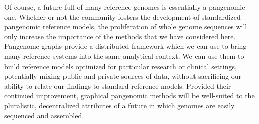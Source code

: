 Of course, a future full of many reference genomes is essentially a pangenomic one.
Whether or not the community fosters the development of standardized pangenomic reference models, the proliferation of whole genome sequences will only increase the importance of the methods that we have considered here.
Pangenome graphs provide a distributed framework which we can use to bring many reference systems into the same analytical context.
We can use them to build reference models optimized for particular research or clinical settings, potentially mixing public and private sources of data, without sacrificing our ability to relate our findings to standard reference models.
Provided their continued improvement, graphical pangenomic methods will be well-suited to the pluralistic, decentralized attributes of a future in which genomes are easily sequenced and assembled.

